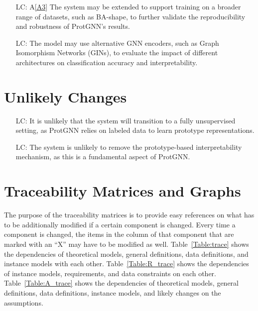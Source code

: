 \documentclass[12pt]{article}
\newcommand{\aref}[1]{A\ref{#1}}
\newcounter{lcnum} %
\begin{document}
\noindent \begin{itemize}

\item[LC\refstepcounter{lcnum}\thelcnum\label{LC_Data}:] \aref{A3} The system may be extended to support training on a broader range of datasets, such as BA-shape,  to further validate the reproducibility and robustness of ProtGNN's results.

\item[LC\refstepcounter{lcnum}\thelcnum\label{LC_Encoder}:] The model may use alternative GNN encoders, such as Graph Isomorphism Networks (GINs), to evaluate the impact of different architectures on classification accuracy and interpretability.

\end{itemize}



\section{Unlikely Changes}    

\noindent \begin{itemize}

\item[LC\refstepcounter{lcnum}\thelcnum\label{LC_Unsupervised}:] It is unlikely that the system will transition to a fully unsupervised setting, as ProtGNN relies on labeled data to learn prototype representations.

\item[LC\refstepcounter{lcnum}\thelcnum\label{LC_Prot}:] The system is unlikely to remove the prototype-based interpretability mechanism, as this is a fundamental aspect of ProtGNN.

\end{itemize}

\section{Traceability Matrices and Graphs}

The purpose of the traceability matrices is to provide easy references on what
has to be additionally modified if a certain component is changed.  Every time a
component is changed, the items in the column of that component that are marked
with an ``X'' may have to be modified as well.  Table~\ref{Table:trace} shows the
dependencies of theoretical models, general definitions, data definitions, and
instance models with each other. Table~\ref{Table:R_trace} shows the
dependencies of instance models, requirements, and data constraints on each
other. Table~\ref{Table:A_trace} shows the dependencies of theoretical models,
general definitions, data definitions, instance models, and likely changes on
the assumptions.
\end{document}
